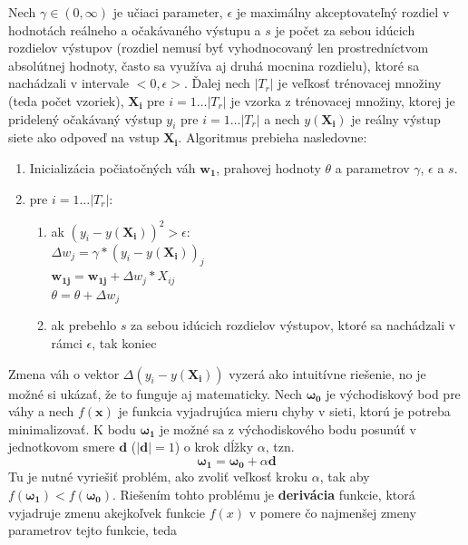 Nech $\gamma \in (0, \infty)$ je učiaci parameter, $\epsilon$ je maximálny akceptovateľný rozdiel v hodnotách reálneho
a očakávaného výstupu a $s$ je počet za sebou idúcich rozdielov výstupov (rozdiel nemusí byť vyhodnocovaný len
prostredníctvom absolútnej hodnoty, často sa využíva aj druhá mocnina rozdielu), ktoré sa nachádzali v intervale
$<0, \epsilon>$.
Ďalej nech $|T_r|$ je veľkosť trénovacej množiny (teda počet vzoriek), $\mathbf{X_i}$ pre $i=1 \dots |T_r|$ je vzorka
z trénovacej množiny, ktorej je pridelený očakávaný výstup $y_i$ pre $i=1 \dots |T_r|$ a nech $y(\mathbf{X_i})$ je reálny
výstup siete ako odpoveď na vstup $\mathbf{X_i}$.
Algoritmus prebieha nasledovne:\cite{algo_ann_delta_rule}
\begin{enumerate}
    \item Inicializácia počiatočných váh $\pmb{w_1}$, prahovej hodnoty $\theta$ a parametrov $\gamma$, $\epsilon$ a $s$.
    \item pre $i = 1 \dots |T_r|$:
    \begin{enumerate}
        \item ak $(y_i-y(\mathbf{X_i}))^2>\epsilon$: \\
                $\Delta{w_j} = \gamma * (y_i-y(\mathbf{X_i}))_j$ \\
                $\pmb{w_{1j}}=\pmb{w_{1j}} + \Delta{w_j} * X_{ij}$ \\
                $\theta=\theta + \Delta{w_j}$
        \item ak prebehlo $s$ za sebou idúcich rozdielov výstupov, ktoré sa nachádzali v rámci $\epsilon$, tak koniec
    \end{enumerate}
\end{enumerate}
Zmena váh o vektor $\Delta (y_i-y(\mathbf{X_i}))$ vyzerá ako intuitívne riešenie, no je možné si ukázať, že to funguje
aj matematicky.
Nech $\pmb{\omega_0}$ je východiskový bod pre váhy a nech $f(\pmb{x})$ je funkcia vyjadrujúca mieru chyby v sieti,
ktorú je potreba minimalizovať.
K bodu $\pmb{\omega_1}$ je možné sa z východiskového bodu posunúť v jednotkovom smere $\pmb{d}$ ($|\pmb{d}|=1$) o krok
dĺžky $\alpha$, tzn.
\begin{equation}
    \pmb{\omega_1} = \pmb{\omega_0} + \alpha\pmb{d}
\end{equation}
Tu je nutné vyriešiť problém, ako zvoliť veľkosť kroku $\alpha$, tak aby $f(\pmb{\omega_1}) < f(\pmb{\omega_0})$.
Riešením tohto problému je \textbf{derivácia} funkcie, ktorá vyjadruje zmenu akejkoľvek funkcie $f(x)$ v pomere čo
najmenšej zmeny parametrov tejto funkcie, teda
